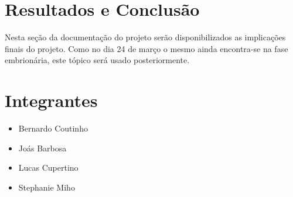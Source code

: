 \documentclass{article}
\begin{document}
	\section{Resultados e Conclusão}
	Nesta seção da documentação do projeto serão disponibilizados as implicações finais do projeto. Como no dia 24 de março o mesmo ainda encontra-se na fase embrionária, este tópico será usado posteriormente.
	
	\section{Integrantes}
	\begin{itemize}
		\item Bernardo Coutinho
		\item Joás Barbosa
		\item Lucas Cupertino
		\item Stephanie Miho
	\end{itemize}

	
\end{document}
